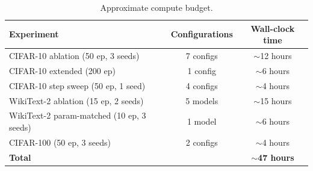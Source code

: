 \documentclass[10pt]{article}
\begin{document}
\begin{table}[h]
\centering
\caption{Approximate compute budget.}
\label{tab:compute_budget}
\small
\begin{tabular}{@{}lcc@{}}
\toprule
Experiment & Configurations & Wall-clock time \\
\midrule
CIFAR-10 ablation (50 ep, 3 seeds)     & 7 configs & $\sim$12 hours \\
CIFAR-10 extended (200 ep)              & 1 config  & $\sim$6 hours \\
CIFAR-10 step sweep (50 ep, 1 seed)    & 4 configs & $\sim$4 hours \\
WikiText-2 ablation (15 ep, 2 seeds)   & 5 models  & $\sim$15 hours \\
WikiText-2 param-matched (10 ep, 3 seeds) & 1 model & $\sim$6 hours \\
CIFAR-100 (50 ep, 3 seeds)            & 2 configs & $\sim$4 hours \\
\midrule
\textbf{Total} & & $\sim$\textbf{47 hours} \\
\bottomrule
\end{tabular}
\end{table}


\end{document}
